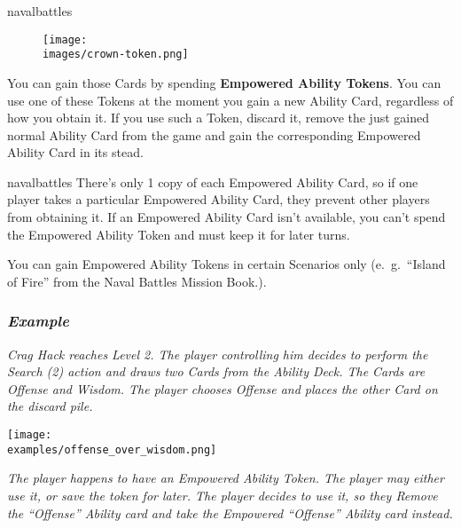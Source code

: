 \begin{multicols*}{2}
\begin{expansion}[before=\vspace*{-11mm}]{navalbattles}
    \setlength\intextsep{0pt}
    \setlength\columnsep{1em}
    \begin{wrapfigure}{r}{0.2\linewidth}
        \texttt{[image: \\images/crown-token.png]}
    \end{wrapfigure}
    You can gain those Cards by spending \textbf{Empowered Ability Tokens}.
    You can use one of these Tokens at the moment you gain a new Ability Card, regardless of how you obtain it.
    If you use such a Token, discard it, remove the just gained normal Ability Card from the game and gain the corresponding Empowered Ability Card in its stead.
\end{expansion}
\columnbreak
\begin{expansion}[before=\vspace*{-11mm}]{navalbattles}
    There's only 1 copy of each Empowered Ability Card, so if one player takes a particular Empowered Ability Card, they prevent other players from obtaining it.
    If an Empowered Ability Card isn't available, you can't spend the Empowered Ability Token and must keep it for later turns.
    \vspace*{1em}

    You can gain Empowered Ability Tokens in certain Scenarios only (e.~g.~``Island of Fire'' from the Naval Battles Mission Book.).\\

    \subsubsection*{\textit{Example}}
    \textit{Crag Hack reaches Level 2.
        The player controlling him decides to perform the Search (2) action and draws two Cards from the Ability Deck.
        The Cards are Offense and Wisdom.
        The player chooses Offense and places the other Card on the discard pile.}

    \begin{center}
      \texttt{[image: \\examples/offense\_over\_wisdom.png]}
    \end{center}

    \textit{The player happens to have an Empowered Ability Token.
        The player may either use it, or save the token for later.
        The player decides to use it, so they Remove the ``Offense'' Ability card and take the Empowered ``Offense'' Ability card instead.}


\end{expansion}
\end{multicols*}

